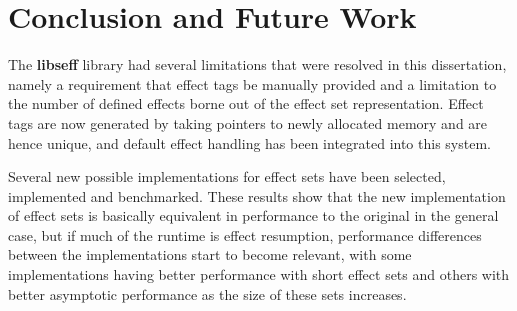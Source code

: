 \documentclass[logo,bsc,singlespacing,parskip,online]{infthesis}
\begin{document}

\chapter{Conclusion and Future Work} \label{conc}


The \textbf{libseff} library had several limitations that were resolved in this dissertation, namely a requirement that effect tags be manually provided and a limitation to the number of defined effects borne out of the effect set representation. Effect tags are now generated by taking pointers to newly allocated memory and are hence unique, and default effect handling has been integrated into this system. 

Several new possible implementations for effect sets have been selected, implemented and benchmarked. These results show that the new implementation of effect sets is basically equivalent in performance to the original in the general case, but if much of the runtime is effect resumption, performance differences between the implementations start to become relevant, with some implementations having better performance with short effect sets and others with better asymptotic performance as the size of these sets increases.
\end{document}
